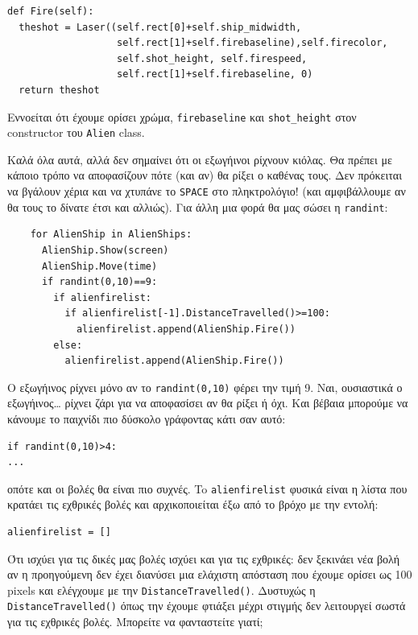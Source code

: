 \begin{verbatim}
def Fire(self):
  theshot = Laser((self.rect[0]+self.ship_midwidth,
                   self.rect[1]+self.firebaseline),self.firecolor,
                   self.shot_height, self.firespeed,
                   self.rect[1]+self.firebaseline, 0)
  return theshot
\end{verbatim}

Εννοείται ότι έχουμε ορίσει χρώμα, {\tt firebaseline} και {\tt shot\_height} στον constructor του {\tt Alien} class. 

Καλά όλα αυτά, αλλά δεν σημαίνει ότι οι εξωγήινοι ρίχνουν κιόλας. Θα πρέπει με κάποιο τρόπο να αποφασίζουν πότε (και αν) θα ρίξει ο καθένας τους. Δεν πρόκειται να βγάλουν χέρια και να χτυπάνε το {\tt SPACE} στο πληκτρολόγιο! (και αμφιβάλλουμε αν θα τους το δίνατε έτσι και αλλιώς). Για άλλη μια φορά θα μας σώσει η {\tt randint}:

\begin{verbatim}
    for AlienShip in AlienShips:
      AlienShip.Show(screen)
      AlienShip.Move(time)
      if randint(0,10)==9:
        if alienfirelist:
          if alienfirelist[-1].DistanceTravelled()>=100:
            alienfirelist.append(AlienShip.Fire())
        else:
          alienfirelist.append(AlienShip.Fire())
\end{verbatim}

Ο εξωγήινος ρίχνει μόνο αν το {\tt randint(0,10)} φέρει την τιμή 9. Ναι, ουσιαστικά ο εξωγήινος\ldots{} ρίχνει ζάρι για να αποφασίσει αν θα ρίξει ή όχι. Και βέβαια μπορούμε να κάνουμε το παιχνίδι πιο δύσκολο γράφοντας κάτι σαν αυτό:
%
\begin{verbatim}
if randint(0,10)>4:
...
\end{verbatim}
%
οπότε και οι βολές θα είναι πιο συχνές. To {\tt alienfirelist} φυσικά είναι η λίστα που κρατάει τις εχθρικές βολές και αρχικοποιείται έξω από το βρόχο με την εντολή:

\begin{verbatim}
alienfirelist = []
\end{verbatim}

Ότι ισχύει για τις δικές μας βολές ισχύει και για τις εχθρικές: δεν ξεκινάει νέα βολή αν η προηγούμενη δεν έχει διανύσει μια ελάχιστη απόσταση που έχουμε ορίσει ως 100 pixels και ελέγχουμε με την {\tt DistanceTravelled()}. Δυστυχώς η {\tt DistanceTravelled()} όπως την έχουμε φτιάξει μέχρι στιγμής δεν λειτουργεί σωστά για τις εχθρικές βολές. Μπορείτε να φανταστείτε γιατί;

